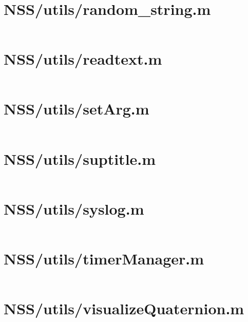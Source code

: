 \pagebreak
\section*{NSS/utils/random\_string.m}\label{code:NSS/utils/random_string.m}
\inputminted[linenos,fontsize=\scriptsize]{matlab}{/home/dcouture/git/mathyourlife/TSatPy/beta_versions/matlab_object_oriented/utils/random_string.m}

\pagebreak
\section*{NSS/utils/readtext.m}\label{code:NSS/utils/readtext.m}
\inputminted[linenos,fontsize=\scriptsize]{matlab}{/home/dcouture/git/mathyourlife/TSatPy/beta_versions/matlab_object_oriented/utils/readtext.m}

\pagebreak
\section*{NSS/utils/setArg.m}\label{code:NSS/utils/setArg.m}
\inputminted[linenos,fontsize=\scriptsize]{matlab}{/home/dcouture/git/mathyourlife/TSatPy/beta_versions/matlab_object_oriented/utils/setArg.m}

\pagebreak
\section*{NSS/utils/suptitle.m}\label{code:NSS/utils/suptitle.m}
\inputminted[linenos,fontsize=\scriptsize]{matlab}{/home/dcouture/git/mathyourlife/TSatPy/beta_versions/matlab_object_oriented/utils/suptitle.m}

\pagebreak
\section*{NSS/utils/syslog.m}\label{code:NSS/utils/syslog.m}
\inputminted[linenos,fontsize=\scriptsize]{matlab}{/home/dcouture/git/mathyourlife/TSatPy/beta_versions/matlab_object_oriented/utils/syslog.m}

\pagebreak
\section*{NSS/utils/timerManager.m}\label{code:NSS/utils/timerManager.m}
\inputminted[linenos,fontsize=\scriptsize]{matlab}{/home/dcouture/git/mathyourlife/TSatPy/beta_versions/matlab_object_oriented/utils/timerManager.m}

\pagebreak
\section*{NSS/utils/visualizeQuaternion.m}\label{code:NSS/utils/visualizeQuaternion.m}
\inputminted[linenos,fontsize=\scriptsize]{matlab}{/home/dcouture/git/mathyourlife/TSatPy/beta_versions/matlab_object_oriented/utils/visualizeQuaternion.m}
